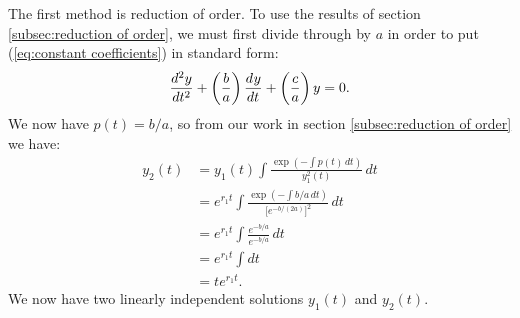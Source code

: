 \documentclass{myart}
\newcommand{\eq}[1]{(\ref{eq:#1})}
\newcommand{\deriv}[3][]{\frac{d^{#1}#2}{d#3^{#1}}}
\begin{document}
The first method is reduction of order. To use the results of section \ref{subsec:reduction of order}, we must first divide through by $a$ in order to put \eq{constant coefficients} in standard form:
\begin{equation*}
\deriv[2]{y}{t} + \left(\frac{b}{a}\right) \deriv{y}{t} + \left(\vphantom{\frac{b}{a}}\frac{c}{a}\right)y = 0.
\end{equation*}
We now have $p(t) = b/a$, so from our work in section \ref{subsec:reduction of order} we have:
\begin{align*}
y_2(t) &= y_1(t) \int \frac{\exp\left(-\int p(t) \,dt\right)}{y_1^2(t)} \,dt \\
&= e^{r_1t} \int \frac{\exp\left(-\int b/a \,dt\right)}{\big[e^{-b/(2a)}\big]^2} \,dt \\
&= e^{r_1t} \int \frac{e^{-b/a}}{e^{-b/a}} \,dt \\
&= e^{r_1t} \int dt \\
&= te^{r_1t}.
\end{align*}
We now have two linearly independent solutions $y_1(t)$ and $y_2(t)$.
\end{document}
